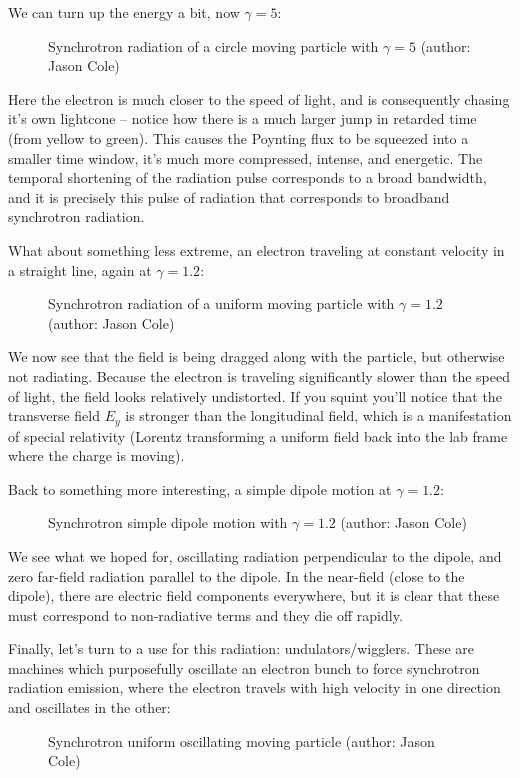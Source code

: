 	We can turn up the energy a bit, now $\gamma = 5$:
	\begin{figure}[H]
		\caption{Synchrotron radiation of a circle moving particle with $\gamma=5$ (author: Jason Cole)}
	\end{figure}
	Here the electron is much closer to the speed of light, and is consequently chasing it's own lightcone – notice how there is a much larger jump in retarded time (from yellow to green). This causes the Poynting flux to be squeezed into a smaller time window, it's much more compressed, intense, and energetic. The temporal shortening of the radiation pulse corresponds to a broad bandwidth, and it is precisely this pulse of radiation that corresponds to broadband synchrotron radiation.
	
	What about something less extreme, an electron traveling at constant velocity in a straight line, again at $\gamma = 1.2$:
	\begin{figure}[H]
		\caption{Synchrotron radiation of a uniform moving particle with $\gamma=1.2$ (author: Jason Cole)}
	\end{figure}
	We now see that the field is being dragged along with the particle, but otherwise not radiating. Because the electron is traveling significantly slower than the speed of light, the field looks relatively undistorted. If you squint you'll notice that the transverse field $E_y$ is stronger than the longitudinal field, which is a manifestation of special relativity (Lorentz transforming a uniform field back into the lab frame where the charge is moving).

	Back to something more interesting, a simple dipole motion at $\gamma = 1.2$:
	\begin{figure}[H]
		\caption{Synchrotron simple dipole motion with $\gamma=1.2$ (author: Jason Cole)}
	\end{figure}
	We see what we hoped for, oscillating radiation perpendicular to the dipole, and zero far-field radiation parallel to the dipole. In the near-field (close to the dipole), there are electric field components everywhere, but it is clear that these must correspond to non-radiative terms and they die off rapidly.

Finally, let’s turn to a use for this radiation: undulators/wigglers. These are machines which purposefully oscillate an electron bunch to force synchrotron radiation emission, where the electron travels with high velocity in one direction and oscillates in the other:
\begin{figure}[H]
		\caption{Synchrotron uniform oscillating moving particle (author: Jason Cole)}
	\end{figure}
	
